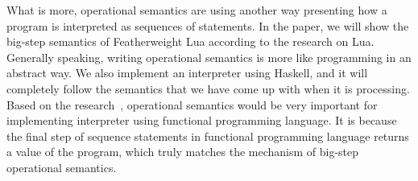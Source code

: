 What is more, operational semantics are using another way presenting how a program is interpreted as sequences of statements. In the paper, we will show the big-step semantics of Featherweight Lua according to the research on Lua. Generally speaking, writing operational semantics is more like programming in an abstract way. We also implement an interpreter using Haskell, and it will completely follow the semantics that we have come up with when it is processing. Based on the research~\cite{AIOS}, operational semantics would be very important for implementing interpreter using functional programming language. It is because the final step of sequence statements in functional programming language returns a value of the program, which truly matches the mechanism of big-step operational semantics.


